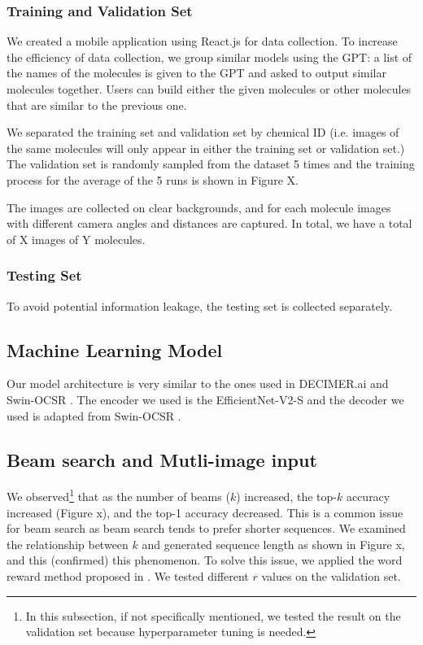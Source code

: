 \documentclass[conference]{IEEEtran}
\begin{document}
\subsubsection{Training and Validation Set}
We created a mobile application using React.js for data collection. To increase the efficiency of data collection, we group similar models using the GPT: a list of the names of the molecules is given to the GPT and asked to output similar molecules together. Users can build either the given molecules or other molecules that are similar to the previous one. 

We separated the training set and validation set by chemical ID (i.e. images of the same molecules will only appear in either the training set or validation set.) The validation set is randomly sampled from the dataset 5 times and the training process for the average of the 5 runs is shown in Figure X.

The images are collected on clear backgrounds, and for each molecule images with different camera angles and distances are captured. In total, we have a total of X images of Y molecules.  

\subsubsection{Testing Set}
To avoid potential information leakage, the testing set is collected separately. 
\subsection{Machine Learning Model}
Our model architecture is very similar to the ones used in DECIMER.ai \cite{decimer} and Swin-OCSR \cite{swinocsr}. The encoder we used is the EfficientNet-V2-S \cite{effv2} and the decoder we used is adapted from Swin-OCSR \cite{swinocsr}. 

\subsection{Beam search and Mutli-image input}


We observed\footnote{In this subsection, if not specifically mentioned, we tested the result on the validation set because hyperparameter tuning is needed.} that as the number of beams ($k$) increased, the top-$k$ accuracy increased (Figure x), and the top-1 accuracy decreased. This is a common issue for beam search as beam search tends to prefer shorter sequences. \cite{yang_breaking_2018} We examined the relationship between $k$ and generated sequence length as shown in Figure x, and this (confirmed) this phenomenon. To solve this issue, we applied the word reward method proposed in \cite{he_improved_2016}. We tested different $r$ values on the validation set. 
\end{document}
